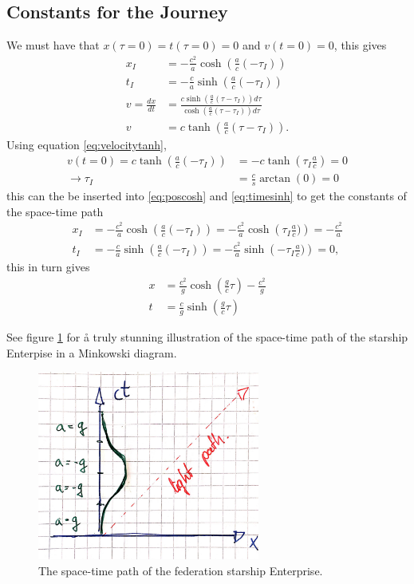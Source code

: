 \documentclass[11pt]{amsart}
\begin{document}
\subsection{Constants for the Journey}
We must have that $x(\tau=0)=t(\tau=0)=0$ and $v(t=0)=0$, this gives
\begin{align}
x_I &= -\frac{c^2}{a}\cosh\left(\frac{a}{c}(- \tau_I) \right) \label{eq:poscosh} \\
t_I &= -\frac{c}{a}\sinh\left(\frac{a}{c}(- \tau_I) \right) \label{eq:timesinh} \\
v = \frac{dx}{dt} &= \frac{c\sinh\left(\frac{a}{c}(\tau - \tau_I) \right)d\tau}{\cosh\left(\frac{a}{c}(\tau - \tau_I) \right)d\tau} \nonumber \\ 
v	&= c\tanh\left(\frac{a}{c}(\tau - \tau_I) \right) \label{eq:velocitytanh}.
\end{align}
Using equation \ref{eq:velocitytanh},
\begin{align}
v(t=0) = c\tanh\left(\frac{a}{c}(- \tau_I) \right) &= -c\tanh \left(\tau_I\frac{a}{c} \right) = 0 \nonumber \\
\rightarrow \tau_I &= \frac{c}{s}\arctan(0) = 0
\end{align}
this can the be inserted into \ref{eq:poscosh} and \ref{eq:timesinh} to get the constants of the space-time path
\begin{align}
x_I &= -\frac{c^2}{a}\cosh\left(\frac{a}{c}(- \tau_I) \right) = -\frac{c^2}{a}\cosh\left( \tau_I\frac{a}{c}) \right) = -\frac{c^2}{a} \\
t_I &= -\frac{c}{a}\sinh\left(\frac{a}{c}(- \tau_I) \right) = -\frac{c^2}{a}\sinh\left( -\tau_I\frac{a}{c}) \right) = 0,
\end{align}
this in turn gives
\begin{align}
x &= \frac{c^2}{g}\cosh\left(\frac{g}{c}\tau\right) - \frac{c^2}{g} \\
t &= \frac{c}{g}\sinh\left(\frac{g}{c}\tau \right)
\end{align}

See figure \ref{fig:spacetimepath} for å truly stunning illustration of the space-time path of the starship Enterpise in a Minkowski diagram.

\begin{figure}
\centering
	\includegraphics[width = 0.65\textwidth]{enterprise.jpg}
	\caption{The space-time path of the federation starship Enterprise.}
	\label{fig:spacetimepath}
\end{figure}
\end{document}
